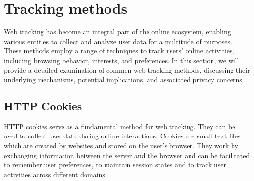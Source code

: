 

\section{Tracking methods}

Web tracking has become an integral part of the online ecosystem, enabling various 
entities to collect and analyze user data for a multitude of purposes. These methods
employ a range of techniques to track users' online activities, including browsing behavior,
interests, and preferences. In this section, we will provide a detailed examination of common web
tracking methods, discussing their underlying mechanisms, potential implications, and associated privacy concerns.

\subsection{HTTP Cookies}

HTTP cookies serve as a fundamental method for web tracking. They can be used to collect user data
during online interactions. Cookies are small text files which are created by websites and stored on the
user's browser. They work by exchanging information between the server and the browser and can be facilitated 
to remember user preferences, to maintain session states and to track user activities across different domains.

